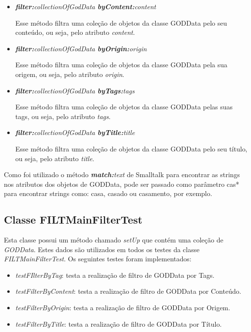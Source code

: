 \begin{itemize}

\item \textit{\textbf{filter:}collectionOfGodData \textbf{byContent:}content} 

Esse método filtra uma coleção de objetos da classe GODData pelo seu conteúdo, ou seja, pelo atributo \textit{content}.\\

\item \textit{\textbf{filter:}collectionOfGodData \textbf{byOrigin:}origin} 

Esse método filtra uma coleção de objetos da classe GODData pela sua origem, ou seja, pelo atributo \textit{origin}.\\

\item \textit{\textbf{filter:}collectionOfGodData \textbf{byTags:}tags} 

Esse método filtra uma coleção de objetos da classe GODData pelas suas tags, ou seja, pelo atributo \textit{tags}.\\

\item \textit{\textbf{filter:}collectionOfGodData \textbf{byTitle:}title} 

Esse método filtra uma coleção de objetos da classe GODData pelo seu título, ou seja, pelo atributo \textit{title}.\\

\end{itemize}

Como foi utilizado o método \textit{\textbf{match:}text} de Smalltalk para encontrar as strings nos atributos dos objetos de GODData, pode ser passado como parâmetro cas* para encontrar strings como: casa, casado ou casamento, por exemplo. 

\subsection{Classe FILTMainFilterTest}

Esta classe possui um método chamado \textit{setUp} que contém uma coleção de \textit{GODData}. Estes dados são utilizados em todos os testes da classe \textit{FILTMainFilterTest}. Os seguintes testes foram implementados:

\begin{itemize}
\item \textit{testFIlterByTag}: testa a realização de filtro de GODData por Tags. 
\item \textit{testFilterByContent}: testa a realização de filtro de GODData por Conteúdo. 
\item \textit{testFilterByOrigin}: testa a realização de filtro de GODData por Origem. 
\item \textit{testFilterByTitle}: testa a realização de filtro de GODData por Título. 
\end{itemize}

